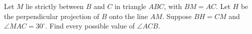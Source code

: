 Let $M$ lie strictly between $B$ and $C$ in triangle $ABC$, with $BM=AC$. Let $H$ be the perpendicular projection of $B$ onto the line $AM$. Suppose $BH=CM$ and $\angle MAC=30^\circ$. Find every possible value of $\angle ACB$.
